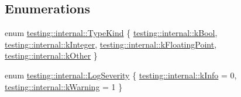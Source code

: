 \subsection*{Enumerations}
\begin{DoxyCompactItemize}
\item 
enum \mbox{\hyperlink{namespacetesting_1_1internal_aa8747bda20137c9aa7f846dee830e686}{testing\+::internal\+::\+Type\+Kind}} \{ \mbox{\hyperlink{namespacetesting_1_1internal_aa8747bda20137c9aa7f846dee830e686a3af2191917fb1796599139b3615302fe}{testing\+::internal\+::k\+Bool}}, 
\mbox{\hyperlink{namespacetesting_1_1internal_aa8747bda20137c9aa7f846dee830e686a8a52f0fd73e05da35c45d80653633cab}{testing\+::internal\+::k\+Integer}}, 
\mbox{\hyperlink{namespacetesting_1_1internal_aa8747bda20137c9aa7f846dee830e686acdce59b8c136926ace18aa9c2995878d}{testing\+::internal\+::k\+Floating\+Point}}, 
\mbox{\hyperlink{namespacetesting_1_1internal_aa8747bda20137c9aa7f846dee830e686ad47f29150ab7a9ec8ce2491f44537347}{testing\+::internal\+::k\+Other}}
 \}
\item 
enum \mbox{\hyperlink{namespacetesting_1_1internal_a203d1a8a2147a53d12bbdae40d443914}{testing\+::internal\+::\+Log\+Severity}} \{ \mbox{\hyperlink{namespacetesting_1_1internal_a203d1a8a2147a53d12bbdae40d443914a396aacfaee2849eaab7c1de9773d624d}{testing\+::internal\+::k\+Info}} = 0, 
\mbox{\hyperlink{namespacetesting_1_1internal_a203d1a8a2147a53d12bbdae40d443914a5beeeab1b0a3caabd0afb43356c1a271}{testing\+::internal\+::k\+Warning}} = 1
 \}
\end{DoxyCompactItemize}
